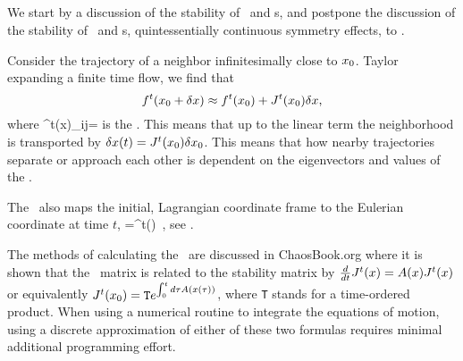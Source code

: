 \subsection{\jacobianM}

We start by a discussion of the stability of \eqva\ and \po s,
and postpone the discussion of the stability of \reqva\ and \rpo s,
quintessentially continuous symmetry effects, to .

Consider the trajectory of a  neighbor infinitesimally close
to ${x_0}$. Taylor expanding a finite time flow, we find that
\[
f^t({x_0} +\delta x) \approx f^t({x_0})+J^t({x_0})\delta x,
\]
where
\beq
\jMps^t(x)_{ij}=
 is
the \jacobianM. This means that up to the linear term the
neighborhood is transported by $\delta x(t)=J^t({x_0})\delta
{x_0}$. This means that how nearby trajectories separate or
approach each other is dependent on the eigenvectors and
values of the \jacobianM.

The \jacobianM\ also maps the initial, Lagrangian coordinate
frame to the Eulerian coordinate at time $t$,
\beq
{}=\jMps^t(\xInit) \velField{\xInit}
\,,
see .

The methods of calculating the \jacobianM\ are discussed in ChaosBook.org where it is shown that the \jacobianM\ matrix is related to the stability matrix by $\frac{d}{dt} J^t(x)=A (x) J^t(x)$ or equivalently $J^t({x_0})= \texttt{T} e^{\int^t_0 d\tau A (x(\tau))}$, where \texttt{T} stands for a time-ordered product. When using a numerical routine to integrate the equations of motion, using a discrete approximation of either of these two formulas requires minimal additional programming effort.




